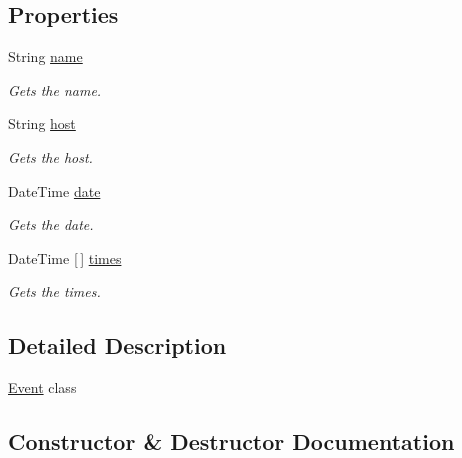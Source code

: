 \subsection*{Properties}
\begin{DoxyCompactItemize}
\item 
String \hyperlink{class_project1_1_1_event_a04f15bb124d4410eece35779864589bf}{name}
\begin{DoxyCompactList}\small\item\em Gets the name. \end{DoxyCompactList}\item 
String \hyperlink{class_project1_1_1_event_a50ac8e67c15316ea93bcbca4b7951fee}{host}
\begin{DoxyCompactList}\small\item\em Gets the host. \end{DoxyCompactList}\item 
Date\+Time \hyperlink{class_project1_1_1_event_a4a7ca6b514ebc64a364c4aac4c7a3b5f}{date}
\begin{DoxyCompactList}\small\item\em Gets the date. \end{DoxyCompactList}\item 
Date\+Time \mbox{[}$\,$\mbox{]} \hyperlink{class_project1_1_1_event_acc6d286c687a5ac9256a146d99de1cb6}{times}
\begin{DoxyCompactList}\small\item\em Gets the times. \end{DoxyCompactList}\end{DoxyCompactItemize}


\subsection{Detailed Description}
\hyperlink{class_project1_1_1_event}{Event} class 



\subsection{Constructor \& Destructor Documentation}
\mbox{\label{class_project1_1_1_event_a55c477aa9e921902fd85ff505c93b661}} 
